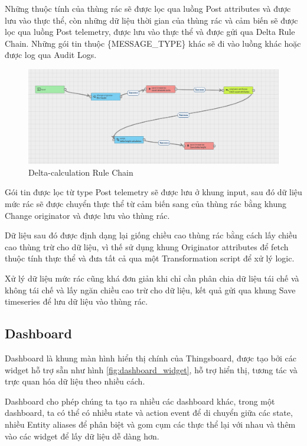 Những thuộc tính của thùng rác sẽ được lọc qua luồng Post attributes và được lưu vào thực thể, còn những dữ liệu thời gian của thùng rác và cảm biến sẽ được lọc qua luồng Post telemetry, được lưu vào thực thể và được gửi qua Delta Rule Chain. Những gói tin thuộc \{MESSAGE\_TYPE\} khác sẽ đi vào luồng khác hoặc được log qua Audit Logs.

\begin{figure}[H]
    \centering
    \includegraphics[width=\textwidth]{images/Khanh/Thingsboard/Delta_rule_chain.PNG}
    \caption{Delta-calculation Rule Chain}
    \label{fig:delta_chain}
\end{figure}

Gói tin được lọc từ type Post telemetry sẽ được lưu ở khung input, sau đó dữ liệu mức rác sẽ được chuyển thực thể từ cảm biến sang của thùng rác bằng khung Change originator và được lưu vào thùng rác.

Dữ liệu sau đó được định dạng lại giống chiều cao thùng rác bằng cách lấy chiều cao thùng trừ cho dữ liệu, vì thế sử dụng khung Originator attributes để fetch thuộc tính thực thể và đưa tất cả qua một Transformation script để xử lý logic.

Xử lý dữ liệu mức rác cũng khá đơn giản khi chỉ cần phân chia dữ liệu tái chế và không tái chế và lấy ngăn chiều cao trừ cho dữ liệu, kết quả gửi qua khung Save timeseries để lưu dữ liệu vào thùng rác.

\subsection{Dashboard}
Dashboard là khung màn hình hiển thị chính của Thingsboard, được tạo bởi các widget hỗ trợ sẵn như hình \ref{fig:dashboard_widget}, hỗ trợ hiển thị, tương tác và trực quan hóa dữ liệu theo nhiều cách. 

Dashboard cho phép chúng ta tạo ra nhiều các dashboard khác, trong một dashboard, ta có thể có nhiều state và action event để di chuyển giữa các state, nhiều Entity aliases để phân biệt và gom cụm các thực thể lại với nhau và thêm vào các widget để lấy dữ liệu dễ dàng hơn.

